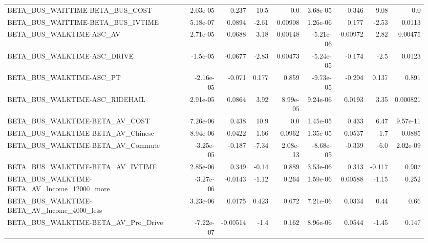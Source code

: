 \begin{tabular}{lrrrrrrrr}
BETA\_BUS\_WAITTIME-BETA\_BUS\_COST                    &    2.03e-05 &        0.237 &      10.5 &      0.0 &   3.68e-05 &       0.346 &         9.08 &           0.0 \\
BETA\_BUS\_WAITTIME-BETA\_BUS\_IVTIME                  &    5.18e-07 &       0.0894 &     -2.61 &  0.00908 &   1.26e-06 &       0.177 &        -2.53 &        0.0113 \\
BETA\_BUS\_WALKTIME-ASC\_AV                           &    2.71e-05 &       0.0688 &      3.18 &  0.00148 &  -5.21e-06 &    -0.00972 &         2.82 &       0.00475 \\
BETA\_BUS\_WALKTIME-ASC\_DRIVE                        &    -1.5e-05 &      -0.0677 &     -2.83 &  0.00473 &  -5.24e-05 &      -0.174 &         -2.5 &        0.0123 \\
BETA\_BUS\_WALKTIME-ASC\_PT                           &   -2.16e-05 &       -0.071 &     0.177 &    0.859 &  -9.73e-05 &      -0.204 &        0.137 &         0.891 \\
BETA\_BUS\_WALKTIME-ASC\_RIDEHAIL                     &    2.91e-05 &       0.0864 &      3.92 & 8.99e-05 &   9.24e-06 &      0.0193 &         3.35 &      0.000821 \\
BETA\_BUS\_WALKTIME-BETA\_AV\_COST                     &    7.26e-06 &        0.438 &      10.9 &      0.0 &   1.45e-05 &       0.433 &         6.47 &      9.57e-11 \\
BETA\_BUS\_WALKTIME-BETA\_AV\_Chinese                  &    8.94e-06 &       0.0422 &      1.66 &   0.0962 &   1.35e-05 &      0.0537 &          1.7 &        0.0885 \\
BETA\_BUS\_WALKTIME-BETA\_AV\_Commute                  &   -3.25e-05 &       -0.187 &     -7.34 & 2.08e-13 &  -8.68e-05 &      -0.339 &         -6.0 &      2.02e-09 \\
BETA\_BUS\_WALKTIME-BETA\_AV\_IVTIME                   &    2.85e-06 &        0.349 &     -0.14 &    0.889 &   3.53e-06 &       0.313 &       -0.117 &         0.907 \\
BETA\_BUS\_WALKTIME-BETA\_AV\_Income\_12000\_more        &   -3.27e-06 &      -0.0143 &     -1.12 &    0.264 &   1.59e-06 &     0.00588 &        -1.15 &         0.252 \\
BETA\_BUS\_WALKTIME-BETA\_AV\_Income\_4000\_less         &    3.23e-06 &       0.0175 &     0.423 &    0.672 &   7.21e-06 &      0.0334 &         0.44 &          0.66 \\
BETA\_BUS\_WALKTIME-BETA\_AV\_Pro\_Drive                &   -7.22e-07 &     -0.00514 &      -1.4 &    0.162 &   8.96e-06 &      0.0544 &        -1.45 &         0.147 \\

\end{tabular}
